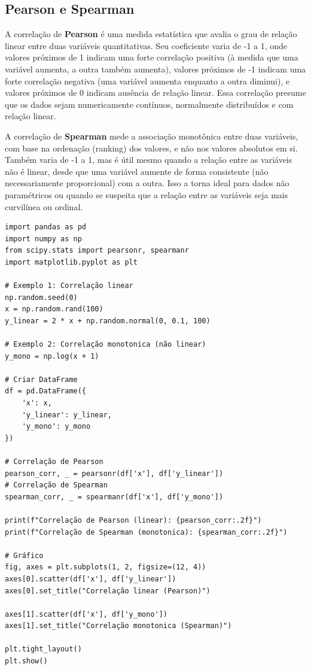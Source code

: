 \subsection{Pearson e Spearman}
A correlação de \textbf{Pearson} é uma medida estatística que avalia o grau de relação linear entre duas variáveis quantitativas. Seu coeficiente varia de -1 a 1, onde valores próximos de 1 indicam uma forte correlação positiva (à medida que uma variável aumenta, a outra também aumenta), valores próximos de -1 indicam uma forte correlação negativa (uma variável aumenta enquanto a outra diminui), e valores próximos de 0 indicam ausência de relação linear. Essa correlação presume que os dados sejam numericamente contínuos, normalmente distribuídos e com relação linear.

A correlação de \textbf{Spearman} mede a associação monotônica entre duas variáveis, com base na ordenação (ranking) dos valores, e não nos valores absolutos em si. Também varia de -1 a 1, mas é útil mesmo quando a relação entre as variáveis não é linear, desde que uma variável aumente de forma consistente (não necessariamente proporcional) com a outra. Isso a torna ideal para dados não paramétricos ou quando se suspeita que a relação entre as variáveis seja mais curvilínea ou ordinal.

\begin{lstlisting}[]
import pandas as pd
import numpy as np
from scipy.stats import pearsonr, spearmanr
import matplotlib.pyplot as plt

# Exemplo 1: Correlação linear
np.random.seed(0)
x = np.random.rand(100)
y_linear = 2 * x + np.random.normal(0, 0.1, 100)

# Exemplo 2: Correlação monotonica (não linear)
y_mono = np.log(x + 1)

# Criar DataFrame
df = pd.DataFrame({
	'x': x,
	'y_linear': y_linear,
	'y_mono': y_mono
})

# Correlação de Pearson
pearson_corr, _ = pearsonr(df['x'], df['y_linear'])
# Correlação de Spearman
spearman_corr, _ = spearmanr(df['x'], df['y_mono'])

print(f"Correlação de Pearson (linear): {pearson_corr:.2f}")
print(f"Correlação de Spearman (monotonica): {spearman_corr:.2f}")

# Gráfico
fig, axes = plt.subplots(1, 2, figsize=(12, 4))
axes[0].scatter(df['x'], df['y_linear'])
axes[0].set_title("Correlação linear (Pearson)")

axes[1].scatter(df['x'], df['y_mono'])
axes[1].set_title("Correlação monotonica (Spearman)")

plt.tight_layout()
plt.show()	
\end{lstlisting}

